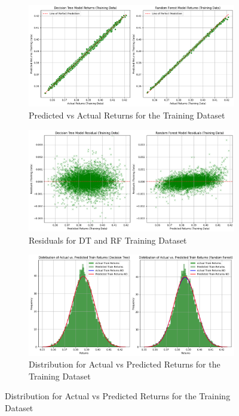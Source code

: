 \documentclass[a4paper,12pt,titlepage]{article}
\numberwithin{equation}{section}
\begin{document}
\begin{figure}[!htbp]
	\centering

	\begin{subfigure}[b]{0.8\linewidth}
		\includegraphics[width=\linewidth,keepaspectratio]{Plots/TrainingPvA.png}
		\caption{Predicted vs Actual Returns for the Training Dataset}
		\label{fig:figure6}
	\end{subfigure}
	
	\vspace{0.2cm} 
	
	\begin{subfigure}[b]{0.8\linewidth}
		\includegraphics[width=\linewidth,keepaspectratio]{Plots/TrainingResidual.png}
		\caption{Residuals for DT and RF Training Dataset}
		\label{fig:figure7}
	\end{subfigure}
	
	\vspace{0.2cm} 
	
	\begin{subfigure}[b]{0.8\linewidth}
		\includegraphics[width=\linewidth,keepaspectratio]{Plots/TrainingDistribution.png}
		\caption{Distribution for Actual vs Predicted Returns for the Training Dataset}
		\label{fig:figure8}
	\end{subfigure}
	

\end{figure}
\end{document}
